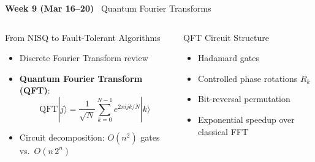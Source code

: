\documentclass[aspectratio=169,12pt]{beamer}
\newcommand{\ket}[1]{|#1\rangle}
\newcommand{\week}[1]{\textcolor{qgold}{\textbf{#1}}}
\begin{document}
\begin{frame}{\week{Week 9 (Mar 16--20)} \ Quantum Fourier Transforms}
  \begin{columns}[T]
      \begin{block}{From NISQ to Fault-Tolerant Algorithms}
        \begin{itemize}
          \item Discrete Fourier Transform review
          \item \textbf{Quantum Fourier Transform (QFT)}:
                \[
                  \mathrm{QFT}\ket{j} = \frac{1}{\sqrt{N}}
                  \sum_{k=0}^{N-1} e^{2\pi i jk/N}\ket{k}
                \]
          \item Circuit decomposition: $O(n^2)$ gates vs.\ $O(n\,2^n)$
        \end{itemize}
      \end{block}
      \begin{block}{QFT Circuit Structure}
        \begin{itemize}
          \item Hadamard gates
          \item Controlled phase rotations $R_k$
          \item Bit-reversal permutation
          \item Exponential speedup over classical FFT
        \end{itemize}
      \end{block}
  \end{columns}
\end{frame}
\end{document}
